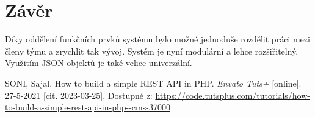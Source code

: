 \documentclass[titlepage]{article}
\begin{document}
\section*{Závěr}
Díky oddělení funkčních prvků systému bylo možné jednoduše rozdělit práci mezi členy týmu a zrychlit tak vývoj. Systém je nyní modulární a lehce roz\-šiřitelný. Využitím JSON objektů je také velice univerzální. 



\begin{thebibliography}{9}
    SONI, Sajal. How to build a simple REST API in PHP. \emph{En\-va\-to Tuts+} [on\-li\-ne]. 27-5-2021 [cit. 2023-03-25]. Dostupné z: \url{https://code.tutsplus.com/tutorials/how-to-build-a-simple-rest-api-in-php--cms-37000}
\end{thebibliography}

    
\end{document}

